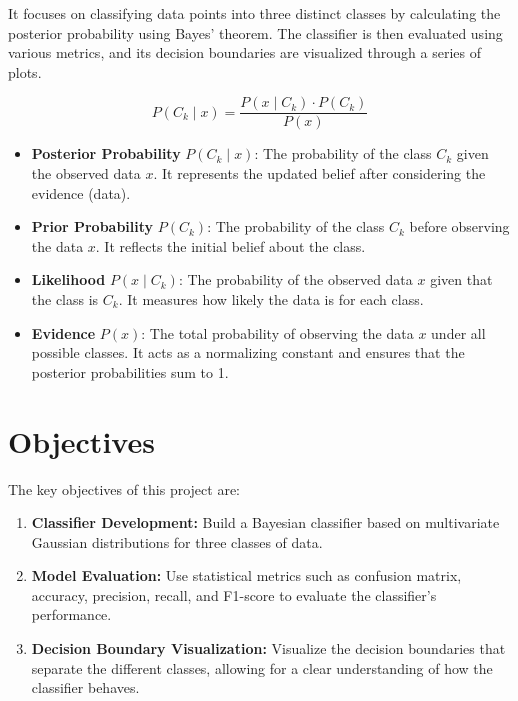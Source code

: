 \documentclass[conference]{IEEEtran}
\begin{document}
It focuses on classifying data points into three distinct classes by calculating the posterior probability using Bayes' theorem. The classifier is then evaluated using various metrics, and its decision boundaries are visualized through a series of plots.
 
	\[
	P(C_k \mid x) = \frac{P(x \mid C_k) \cdot P(C_k)}{P(x)}
	\]
	
	\begin{itemize}
		\item \textbf{Posterior Probability} \( P(C_k \mid x) \): The probability of the class \( C_k \) given the observed data \( x \). It represents the updated belief after considering the evidence (data).
		
		\item \textbf{Prior Probability} \( P(C_k) \): The probability of the class \( C_k \) before observing the data \( x \). It reflects the initial belief about the class.
		
		\item \textbf{Likelihood} \( P(x \mid C_k) \): The probability of the observed data \( x \) given that the class is \( C_k \). It measures how likely the data is for each class.
		
		\item \textbf{Evidence} \( P(x) \): The total probability of observing the data \( x \) under all possible classes. It acts as a normalizing constant and ensures that the posterior probabilities sum to 1.
	\end{itemize}


\section{Objectives}

The key objectives of this project are:

\begin{enumerate}
	\item \textbf{Classifier Development:} Build a Bayesian classifier based on multivariate Gaussian distributions for three classes of data.
	\item \textbf{Model Evaluation:} Use statistical metrics such as confusion matrix, accuracy, precision, recall, and F1-score to evaluate the classifier’s performance.
	\item \textbf{Decision Boundary Visualization:} Visualize the decision boundaries that separate the different classes, allowing for a clear understanding of how the classifier behaves.
\end{enumerate}
\end{document}
